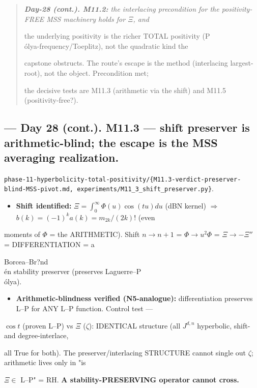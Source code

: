 \documentclass[10pt]{article}
\begin{document}
\begin{quote}\itshape
\textbf{Day-28 (cont.). M11.2:} the interlacing precondition for the positivity-FREE MSS machinery holds for $\Xi$, and\par
the underlying positivity is the richer TOTAL positivity (P\\\'olya-frequency/Toeplitz), not the quadratic kind the\par
capstone obstructs. The route's escape is the method (interlacing largest-root), not the object. Precondition met;\par
the decisive tests are M11.3 (arithmetic via the shift) and M11.5 (positivity-free?).\par
\end{quote}

\subsection*{ --- Day 28 (cont.). M11.3 --- shift preserver is arithmetic-blind; the escape is the MSS averaging realization.}
\texttt{phase-11-hyperbolicity-total-positivity/\{M11.3-verdict-preserver-blind-MSS-pivot.md, experiments/M11\_3\_shift\_preserver.py\}}.\par
\begin{itemize}
\item \textbf{Shift identified:} $\Xi=\int_0^\infty\Phi(u)\cos(tu)du$ (dBN kernel) \ensuremath{\Rightarrow} $b(k)=(-1)^k a(k)=m_{2k}/(2k)!$ (even
\end{itemize}
  moments of $\Phi$ = the ARITHMETIC). Shift $n\to n+1$ = $\Phi\to u^2\Phi$ = $\Xi\to-\Xi''$ = DIFFERENTIATION = a\par
  Borcea--Br?nd\\\'en stability preserver (preserves Laguerre--P\\\'olya).\par
\begin{itemize}
\item \textbf{Arithmetic-blindness verified (N5-analogue):} differentiation preserves L--P for ANY L--P function. Control test ---
\end{itemize}
  $\cos t$ (proven L--P) vs $\Xi$ ($\zeta$): IDENTICAL structure (all $J^{d,n}$ hyperbolic, shift- and degree-interlace,\par
  all True for both). The preserver/interlacing STRUCTURE cannot single out $\zeta$; arithmetic lives only in "is\par
  $\Xi\in$ L--P" = RH. \textbf{A stability-PRESERVING operator cannot cross.}\par
\end{document}

